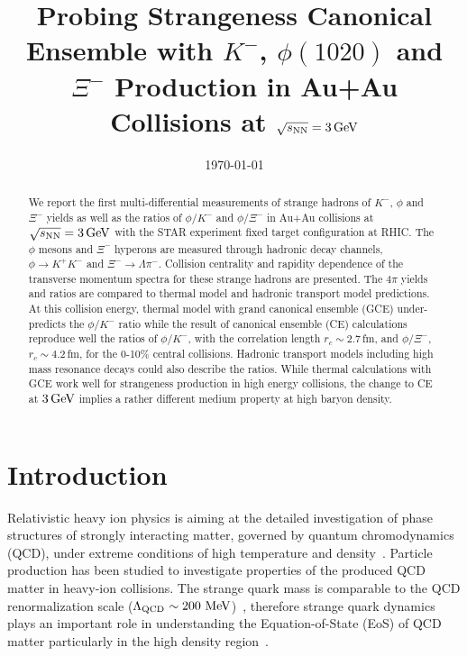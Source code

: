 \documentclass[aps,tightenlines,superscriptaddress,twocolumn]{revtex4-1}
\begin{document}
\title{Probing Strangeness Canonical Ensemble with $K^{-}$, $\phi(1020)$ and $\Xi^{-}$ Production in Au+Au Collisions at ${\sqrt{s_{\rm NN}} = \rm{3\,GeV}}$}%


%

\linenumbers

\date{\today}

\begin{abstract}
We report the first multi-differential measurements of strange hadrons of $K^{-}$, $\phi$ and $\Xi^{-}$ yields as well as the ratios of $\phi/K^-$ and $\phi/\Xi^-$ in Au+Au collisions at ${\sqrt{s_{\rm NN}} = \rm{3\,GeV}}$ with the STAR experiment fixed target configuration at RHIC. The $\phi$ mesons and $\Xi^{-}$ hyperons are measured through hadronic decay channels, $\phi\rightarrow K^+K^-$ and $\Xi^-\rightarrow \Lambda\pi^-$. 
Collision centrality and rapidity dependence of the transverse momentum spectra for these strange hadrons are presented. The $4\pi$ yields and ratios are compared to thermal model and hadronic transport model predictions.
At this collision energy, thermal model with grand canonical ensemble (GCE) under-predicts the $\phi/K^-$ ratio while the result of canonical ensemble (CE) calculations reproduce well the ratios of $\phi/K^-$, with the correlation length $r_c \sim 2.7$\,fm, and $\phi/\Xi^-$, $r_c \sim 4.2$\,fm, for the 0-10\% central collisions. Hadronic transport models including high mass resonance decays could also describe the ratios.
While thermal calculations with GCE work well for strangeness production in high energy collisions, the change to CE at $\rm{3\,GeV}$ implies a rather different medium property at high baryon density. 
\end{abstract}

\maketitle

\linenumbers

\section{Introduction}
\label{introduction}

Relativistic heavy ion physics is aiming at the detailed investigation of phase structures of strongly interacting matter, governed by quantum chromodynamics (QCD), under extreme conditions of high temperature and density~\cite{akiba2015hot,Busza_ARNPS,StarWhitePaper}. Particle production has been studied to investigate properties of the produced QCD matter in heavy-ion collisions. The strange quark mass is comparable to the QCD renormalization scale ($\Lambda_{\rm{QCD}}$\,$\sim\textup{200 MeV}$)~\cite{Rafelski:1982pu,Koch:1986ud}, 
therefore strange quark dynamics plays an important role in understanding the Equation-of-State (EoS) of QCD matter particularly in the high density region~\cite{KO_sQM17,Danielewicz1592,Tetyana_ICNN,KO.PhysRevLett.55.2661,Ks0_Lambda_HADES,CASSING.openCharm.2001753}. 
\end{document}
